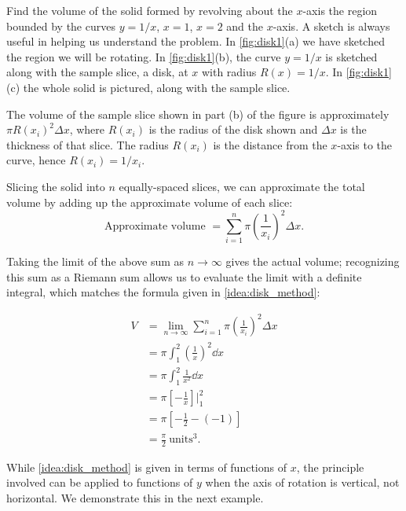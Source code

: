 \begin{example}\label{ex_disk1}
Find the volume of the solid formed by revolving about the $x$-axis the region bounded by the curves $y=1/x$, $x=1$, $x=2$ and the $x$-axis.
\solution
A sketch is always useful in helping us understand the problem. In \autoref{fig:disk1}(a) we have sketched the region we will be rotating.  In \autoref{fig:disk1}(b), the curve $y=1/x$ is sketched along with the sample slice, a disk, at $x$ with radius $R(x)=1/x$. In \autoref{fig:disk1}(c) the whole solid is pictured, along with the sample slice.

The volume of the sample slice shown in part (b) of the figure is approximately $\pi R(x_i)^2\Delta x$, where $R(x_i)$ is the radius of the disk shown and $\Delta x$ is the thickness of that slice. The radius $R(x_i)$ is the distance from the $x$-axis to the curve, hence $R(x_i) = 1/x_i$.

Slicing the solid into $n$ equally-spaced slices, we can approximate the total volume by adding up the approximate volume of each slice:
\[\text{Approximate volume } = \sum_{i=1}^n \pi \left(\frac1{x_i}\right)^2\Delta x.\]

Taking the limit of the above sum as $n\to\infty$ gives the actual volume; recognizing this sum as a Riemann sum allows us to evaluate the limit with a definite integral, which matches the formula given in \autoref{idea:disk_method}:

\begin{align*}
	V &= \lim_{n\to\infty}\sum_{i=1}^n \pi \left(\frac1{x_i}\right)^2\Delta x\\
		&= \pi\int_1^2 \left(\frac1x\right)^2\dd x \\
		&= \pi\int_1^2 \frac1{x^2}\dd x \\
		&= \pi\left[-\frac1x\right]\Big|_1^2 \\
		&= \pi \left[-\frac12 - \left(-1\right)\right] \\
		&= \frac{\pi}{2}\ \text{units}^3.
\end{align*}
\end{example}

While \autoref{idea:disk_method} is given in terms of functions of $x$, the principle involved can be applied to functions of $y$ when the axis of rotation is vertical, not horizontal. We demonstrate this in the next example.

